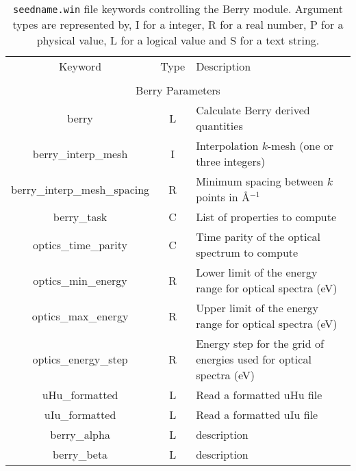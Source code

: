 \begin{table}[hH!]
\begin{center}
\begin{tabular}{|c|c|p{6cm}|}
\hline
Keyword & Type & Description \\
        &      &             \\
\hline\hline
\multicolumn{3}{|c|}{Berry Parameters} \\
\hline
{\sc berry}  & L & Calculate Berry derived quantities \\
{\sc berry\_interp\_mesh} & I & Interpolation $k$-mesh (one or three integers)\\ 
{\sc berry\_interp\_mesh\_spacing}& R & Minimum spacing between $k$ points in \AA$^{-1}$\\
{\sc berry\_task}& C  & List of properties to compute \\
{\sc optics\_time\_parity}& C & Time parity of the optical spectrum to compute\\ 
{\sc optics\_min\_energy} & R & Lower limit of the energy range for
optical spectra (eV) \\
{\sc optics\_max\_energy}& R & Upper limit of the energy range for
optical spectra (eV) \\
{\sc optics\_energy\_step}& R & Energy step for the grid of energies
used for optical spectra (eV)\\
{\sc uHu\_formatted}& L & Read a formatted uHu file \\
{\sc uIu\_formatted}& L & Read a formatted uIu file\\
{\sc berry\_alpha}& L & description\\
{\sc berry\_beta}& L & description\\
\hline
\end{tabular}
\caption[Parameter file keywords controlling the Berry module.]
{{\tt seedname.win} file keywords controlling the Berry module. Argument types
are represented by, I for a integer, R for a real number, P for a
physical value, L for a logical value and S for a text string.}
\label{parameter_keywords_berry}
\end{center}
\end{table}



